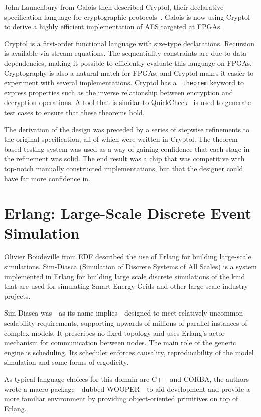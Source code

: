 \documentclass{jfp1}
\begin{document}
John Launchbury from Galois then described Cryptol, their declarative
specification language for cryptographic
protocols~\cite{Erkok:2009:PES:1481848.1481860}.  Galois is now using Cryptol
to derive a highly efficient implementation of AES targeted at FPGAs.

Cryptol is a first-order functional language with size-type declarations.
Recursion is available via stream equations.  The sequentiality constraints are
due to data dependencies, making it possible to efficiently evaluate this
language on FPGAs. Cryptography is also a natural match for FPGAs, and Cryptol
makes it easier to experiment with several implementations. Cryptol has a {\tt
theorem} keyword to express properties such as the inverse relationship between
encryption and decryption operations. A tool that is similar to
QuickCheck~\cite{Claessen:2000:QLT:351240.351266} is used to generate test
cases to ensure that these theorems hold.

The derivation of the design was preceded by a series of stepwise refinements to
the original specification, all of which were written in Cryptol.  The
theorem-based testing system was used as a way of gaining confidence that each
stage in the refinement was solid.  The end result was a chip that was
competitive with top-notch manually constructed implementations, but that the
designer could have far more confidence in.

\section{Erlang: Large-Scale Discrete Event Simulation}

Olivier Boudeville from EDF described the use of Erlang for building
large-scale simulations.  Sim-Diasca (Simulation of Discrete Systems of All
Scales) is a system implemented in Erlang for building large scale discrete
simulations of the kind that are used for simulating Smart Energy Grids and
other large-scale industry projects.

Sim-Diasca was---as its name implies---designed to meet relatively uncommon
scalability requirements, supporting upwards of millions of parallel instances
of complex models.  It prescribes no fixed topology and uses Erlang's actor
mechanism for communication between nodes.  The main role of the generic engine
is scheduling.  Its scheduler enforces causality, reproducibility of the model
simulation and some forms of ergodicity.

As typical language choices for this domain are C++ and CORBA, the authors
wrote a macro package---dubbed WOOPER---to aid development and provide a
more familiar environment by providing object-oriented primitives on top of
Erlang.
\end{document}
